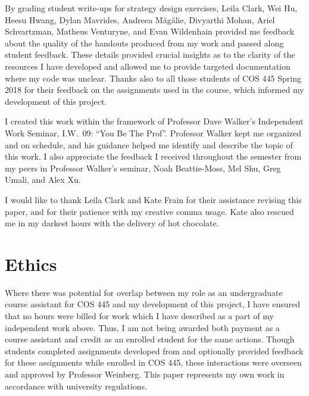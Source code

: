 \documentclass[pageno]{jpaper}
\begin{document}
By grading student write-ups for strategy design exercises, Leila Clark, Wei Hu, Heesu Hwang, Dylan Mavrides, Andreea M\u{a}g\u{a}lie, Divyarthi Mohan, Ariel Schvartzman, Matheus Venturyne, and Evan Wildenhain provided me feedback about the quality of the handouts produced from my work and passed along student feedback.
These details provided crucial insights as to the clarity of the resources I have developed and allowed me to provide targeted documentation where my code was unclear.
Thanks also to all those students of COS 445 Spring 2018 for their feedback on the assignments used in the course, which informed my development of this project.

I created this work within the framework of Professor Dave Walker's Independent Work Seminar, I.W.\ 09: ``You Be The Prof''.
Professor Walker kept me organized and on schedule, and his guidance helped me identify and describe the topic of this work.
I also appreciate the feedback I received throughout the semester from my peers in Professor Walker's seminar, Noah Beattie-Moss, Mel Shu, Greg Umali, and Alex Xu.

I would like to thank Leila Clark and Kate Frain for their assistance revising this paper, and for their patience with my creative comma usage.
Kate also rescued me in my darkest hours with the delivery of hot chocolate.

\section*{Ethics}
Where there was potential for overlap between my role as an undergraduate course assistant for COS 445 and my development of this project, I have ensured that no hours were billed for work which I have described as a part of my independent work above.
Thus, I am not being awarded both payment as a course assistant and credit as an enrolled student for the same actions.
Though students completed assignments developed from and optionally provided feedback for these assignments while enrolled in COS 445, these interactions were overseen and approved by Professor Weinberg.
This paper represents my own work in accordance with university regulations.

\medskip
\singlespacing{}
\printbibliography[]
\end{document}

